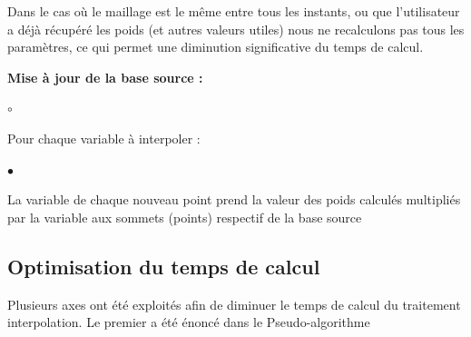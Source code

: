 \vspace{0.5cm}

\noindent Dans le cas où le maillage est le même entre tous les instants, ou que l'utilisateur a déjà récupéré les poids (et autres valeurs utiles) nous ne recalculons pas tous les paramètres, ce qui permet une diminution significative du temps de calcul.

\vspace{0.5cm}

\textbf{Mise à jour de la base source :}
\begin{list}{$\circ$}{\leftmargin=0.5cm  \itemsep=0cm}
    \item Pour chaque variable à interpoler :
    \begin{list}{$\bullet$}{\leftmargin=0.5cm  \itemsep=0cm}
        \item La variable de chaque nouveau point prend la valeur des poids calculés multipliés par la variable aux sommets (points) respectif de la base source
    \end{list}
\end{list}




\subsection{Optimisation du temps de calcul}

Plusieurs axes ont été exploités afin de diminuer le temps de calcul du traitement interpolation.
Le premier a été énoncé dans le Pseudo-algorithme 


